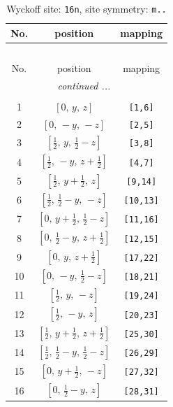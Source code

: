 \documentclass[fleqn,8pt]{jsarticle}
\begin{document}
\renewcommand{\arraystretch}{1.2}
\begin{longtable}{ccc}
\caption{Wyckoff site: {\tt 16n}, site symmetry: {\tt m..}}
 \\
 \hline \hline
No. & position & mapping \\ \hline \endfirsthead

\multicolumn{2}{l}{\tablename\ \thetable{}} \\
 \hline \hline
No. & position & mapping \\ \hline \endhead

 \hline \hline
\multicolumn{2}{r}{\footnotesize\it continued ...} \\ \endfoot

 \hline \hline
\multicolumn{2}{r}{} \\ \endlastfoot

1 & $\left[ 0,\, y,\, z \right]$ & {\tt [1,6]} \\ \hline
2 & $\left[ 0,\, - y,\, - z \right]$ & {\tt [2,5]} \\ \hline
3 & $\left[ \frac{1}{2},\, y,\, \frac{1}{2} - z \right]$ & {\tt [3,8]} \\ \hline
4 & $\left[ \frac{1}{2},\, - y,\, z + \frac{1}{2} \right]$ & {\tt [4,7]} \\ \hline
5 & $\left[ \frac{1}{2},\, y + \frac{1}{2},\, z \right]$ & {\tt [9,14]} \\ \hline
6 & $\left[ \frac{1}{2},\, \frac{1}{2} - y,\, - z \right]$ & {\tt [10,13]} \\ \hline
7 & $\left[ 0,\, y + \frac{1}{2},\, \frac{1}{2} - z \right]$ & {\tt [11,16]} \\ \hline
8 & $\left[ 0,\, \frac{1}{2} - y,\, z + \frac{1}{2} \right]$ & {\tt [12,15]} \\ \hline
9 & $\left[ 0,\, y,\, z + \frac{1}{2} \right]$ & {\tt [17,22]} \\ \hline
10 & $\left[ 0,\, - y,\, \frac{1}{2} - z \right]$ & {\tt [18,21]} \\ \hline
11 & $\left[ \frac{1}{2},\, y,\, - z \right]$ & {\tt [19,24]} \\ \hline
12 & $\left[ \frac{1}{2},\, - y,\, z \right]$ & {\tt [20,23]} \\ \hline
13 & $\left[ \frac{1}{2},\, y + \frac{1}{2},\, z + \frac{1}{2} \right]$ & {\tt [25,30]} \\ \hline
14 & $\left[ \frac{1}{2},\, \frac{1}{2} - y,\, \frac{1}{2} - z \right]$ & {\tt [26,29]} \\ \hline
15 & $\left[ 0,\, y + \frac{1}{2},\, - z \right]$ & {\tt [27,32]} \\ \hline
16 & $\left[ 0,\, \frac{1}{2} - y,\, z \right]$ & {\tt [28,31]} \\
\end{longtable}
\end{document}

